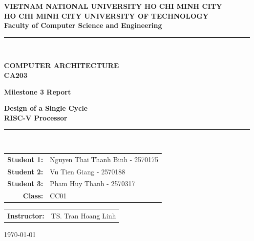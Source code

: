 \begin{titlepage}
\centering

\textbf{\large VIETNAM NATIONAL UNIVERSITY HO CHI MINH CITY}\\
\textbf{\large HO CHI MINH CITY UNIVERSITY OF TECHNOLOGY}\\
\textbf{\normalsize Faculty of Computer Science and Engineering}\\
\vspace{0.5cm}

\vspace{0.5cm}

\rule{\linewidth}{0.5mm}\\
\vspace{0.5cm}

\textbf{\huge COMPUTER ARCHITECTURE}\\
\textbf{\large CA203}\\
\vspace{0.3cm}

\textbf{\Large Milestone 3 Report}\\
\vspace{0.3cm}

\textbf{\LARGE Design of a Single Cycle}\\
\textbf{\LARGE RISC-V Processor}\\
\vspace{0.3cm}

\rule{\linewidth}{0.5mm}\\
\vspace{1cm}

\begin{tabular}{rl}
\textbf{Student 1:} & Nguyen Thai Thanh Binh - 2570175\\[0.2cm]
\textbf{Student 2:} & Vu Tien Giang - 2570188\\[0.2cm]
\textbf{Student 3:} & Pham Huy Thanh - 2570317\\[0.5cm]
\textbf{Class:} & CC01\\[0.3cm]
\end{tabular}

\vspace{1cm}

\begin{tabular}{rl}
\textbf{Instructor:} & TS. Tran Hoang Linh
\end{tabular}

\vfill

{\large \today}

\end{titlepage}

